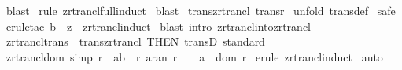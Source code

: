 \begin{isabellebody}
\isanewline
{}\isamarkupfalse%
\ blast\isanewline
\isanewline
{}\isamarkupfalse%
\ {\isacharparenleft}rule\ zrtrancl{\isacharunderscore}full{\isacharunderscore}induct{\isacharparenright}\isanewline
{}\isamarkupfalse%
\ {\isacharparenleft}blast{\isacharparenright}{\isacharplus}\isanewline
{}\isamarkupfalse%
%
\endisatagproof
{\isafoldproof}%
%
\isadelimproof
\isanewline
%
\endisadelimproof
\isanewline
\isanewline
\isanewline
\isanewline
\isanewline
{}\isamarkupfalse%
\ trans{\isacharunderscore}zrtrancl{\isacharcolon}\ {\isachardoublequoteopen}trans{\isacharparenleft}r{\isacharpercent}{\isacharasterisk}{\isacharparenright}{\isachardoublequoteclose}\isanewline
%
\isadelimproof
%
\endisadelimproof
%
\isatagproof
{}\isamarkupfalse%
\ {\isacharparenleft}unfold\ trans{\isacharunderscore}def{\isacharparenright}\isanewline
{}\isamarkupfalse%
\ safe\isanewline
{}\isamarkupfalse%
\ {\isacharparenleft}erule{\isacharunderscore}tac\ b\ {\isacharequal}\ {\isachardoublequoteopen}z{\isachardoublequoteclose}\ \ zrtrancl{\isacharunderscore}induct{\isacharparenright}\isanewline
{}\isamarkupfalse%
\ {\isacharparenleft}blast\ intro{\isacharcolon}\ zrtrancl{\isacharunderscore}into{\isacharunderscore}zrtrancl{\isacharparenright}{\isacharplus}\isanewline
{}\isamarkupfalse%
%
\endisatagproof
{\isafoldproof}%
%
\isadelimproof
\isanewline
%
\endisadelimproof
\isanewline
{}\isamarkupfalse%
\ zrtrancl{\isacharunderscore}trans\ {\isacharequal}\ trans{\isacharunderscore}zrtrancl\ {\isacharbrackleft}THEN\ transD{\isacharcomma}\ standard{\isacharbrackright}\isanewline
\isanewline
{}\isamarkupfalse%
\ zrtrancl{\isacharunderscore}dom{}\ {\isacharbrackleft}simp{\isacharbrackright}{\isacharcolon}\ {\isachardoublequoteopen}{\isacharbang}{\isacharbang}r\ {\isachardot}{\isacharbrackleft}{\isacharbar}\ {\isacharparenleft}a{\isacharcomma}b{\isacharparenright}\ {\isacharcolon}\ {\isacharparenleft}r{\isacharpercent}{\isacharasterisk}{\isacharparenright}{\isacharsemicolon}\ a{\isachartilde}{\isacharcolon}ran\ r\ {\isacharbar}{\isacharbrackright}\ \ {\isacharequal}{\isacharequal}{\isachargreater}\ a\ {\isacharcolon}\ dom\ r{\isachardoublequoteclose}\isanewline
%
\isadelimproof
%
\endisadelimproof
%
\isatagproof
{}\isamarkupfalse%
\ {\isacharparenleft}erule\ zrtrancl{\isacharunderscore}induct{\isacharparenright}\isanewline
{}\isamarkupfalse%
\ auto\isanewline

\end{isabellebody}
